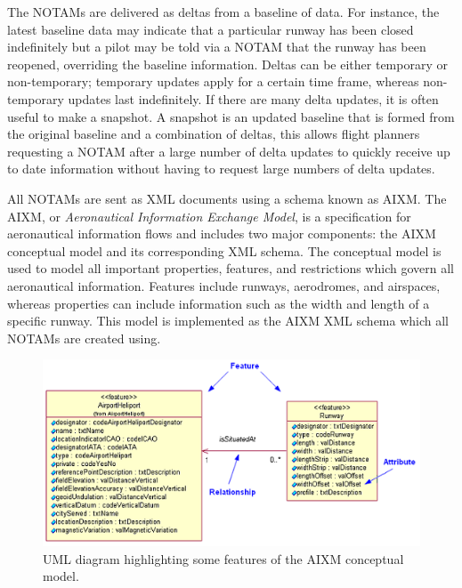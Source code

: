 \documentclass[a4paper, 12pt, twoside]{article}
\begin{document}
The NOTAMs are delivered as deltas from a baseline of data. For instance, the latest baseline data may indicate that a particular runway has been closed indefinitely but a pilot may be told via a NOTAM that the runway has been reopened, overriding the baseline information. Deltas can be either temporary or non-temporary; temporary updates apply for a certain time frame, whereas non-temporary updates last indefinitely. If there are many delta updates, it is often useful to make a snapshot. A snapshot is an updated baseline that is formed from the original baseline and a combination of deltas, this allows flight planners requesting a NOTAM after a large number of delta updates to quickly receive up to date information without having to request large numbers of delta updates.

All NOTAMs are sent as XML documents using a schema known as AIXM. The AIXM, or \emph{Aeronautical Information Exchange Model}, is a specification for aeronautical information flows and includes two major components: the AIXM conceptual model and its corresponding XML schema. The conceptual model is used to model all important properties, features, and restrictions which govern all aeronautical information. Features include runways, aerodromes, and airspaces, whereas properties can include information such as the width and length of a specific runway. This model is implemented as the AIXM XML schema which all NOTAMs are created using.

\begin{figure}
\begin{center}
\def\svgwidth{\columnwidth}
\includegraphics[scale=0.5]{aixmUML.png}
\end{center}
\caption{UML diagram highlighting some features of the AIXM conceptual model.\cite{aixm}}
\label{fig:aixm}
\end{figure}

\newpage
\end{document}
